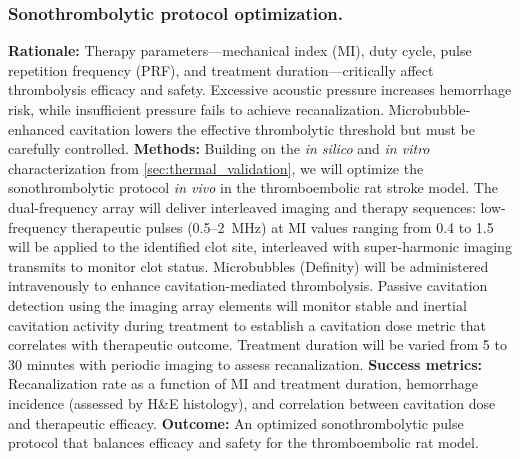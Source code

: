 \subsubsection{Sonothrombolytic protocol optimization.\label{sec:sono_optimization}}
\textbf{Rationale:} Therapy parameters---mechanical index (MI), duty cycle, pulse repetition frequency (PRF), and treatment duration---critically affect thrombolysis efficacy and safety. Excessive acoustic pressure increases hemorrhage risk, while insufficient pressure fails to achieve recanalization. Microbubble-enhanced cavitation lowers the effective thrombolytic threshold but must be carefully controlled. \textbf{Methods:} Building on the \textit{in silico} and \textit{in vitro} characterization from \ref{sec:thermal_validation}, we will optimize the sonothrombolytic protocol \textit{in vivo} in the thromboembolic rat stroke model. The dual-frequency array will deliver interleaved imaging and therapy sequences: low-frequency therapeutic pulses (0.5--2~MHz) at MI values ranging from 0.4 to 1.5 will be applied to the identified clot site, interleaved with super-harmonic imaging transmits to monitor clot status. Microbubbles (Definity) will be administered intravenously to enhance cavitation-mediated thrombolysis. Passive cavitation detection using the imaging array elements will monitor stable and inertial cavitation activity during treatment to establish a cavitation dose metric that correlates with therapeutic outcome. Treatment duration will be varied from 5 to 30 minutes with periodic imaging to assess recanalization. \textbf{Success metrics:} Recanalization rate as a function of MI and treatment duration, hemorrhage incidence (assessed by H\&E histology), and correlation between cavitation dose and therapeutic efficacy. \textbf{Outcome:} An optimized sonothrombolytic pulse protocol that balances efficacy and safety for the thromboembolic rat model.

